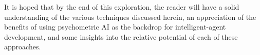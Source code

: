It is hoped that by the end of this exploration, the reader will have a solid understanding of the various techniques discussed herein, an appreciation of the benefits of using psychometric AI as the backdrop for intelligent-agent development, and some insights into the relative potential of each of these approaches.